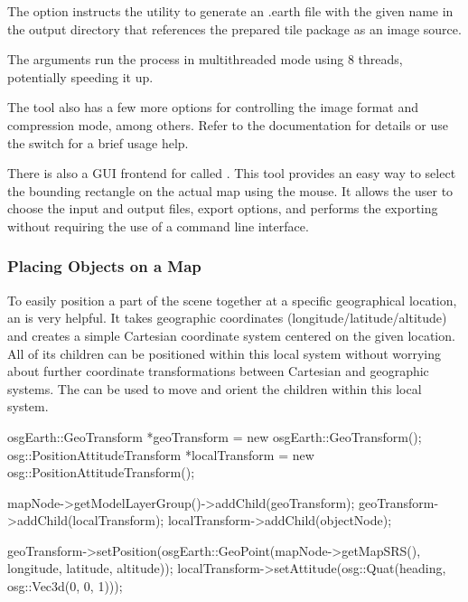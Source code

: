 The  option instructs the utility to
generate an .earth file with the given name in the output directory that
references the prepared tile package as an image source.

The  arguments run the process in multithreaded
mode using 8 threads, potentially speeding it up.

The tool also has a few more options for controlling the image format and
compression mode, among others. Refer to the documentation for details or use
the  switch for a brief usage help.

\begin{hint}
There is also a GUI frontend for  called
. This tool provides an easy way to select the
bounding rectangle on the actual map using the mouse. It allows the user to
choose the input and output files, export options, and performs the exporting
without requiring the use of a command line interface.
\end{hint}


\subsubsection{Placing Objects on a Map}
\label{sec:graphics:osgearth-placing-objects}

To easily position a part of the scene together at a specific geographical
location, an  is very helpful. It takes
geographic coordinates (longitude/latitude/altitude) and creates a simple
Cartesian coordinate system centered on the given location. All of its children
can be positioned within this local system without worrying about further
coordinate transformations between Cartesian and geographic systems. The
 can be used to move and orient the
children within this local system.

\begin{cpp}
osgEarth::GeoTransform *geoTransform = new osgEarth::GeoTransform();
osg::PositionAttitudeTransform *localTransform = new osg::PositionAttitudeTransform();

mapNode->getModelLayerGroup()->addChild(geoTransform);
geoTransform->addChild(localTransform);
localTransform->addChild(objectNode);

geoTransform->setPosition(osgEarth::GeoPoint(mapNode->getMapSRS(), longitude, latitude, altitude));
localTransform->setAttitude(osg::Quat(heading, osg::Vec3d(0, 0, 1)));
\end{cpp}

